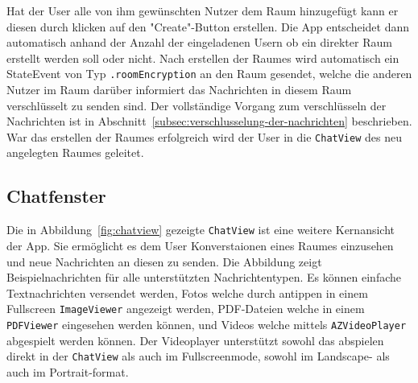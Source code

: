     Hat der User alle von ihm gewünschten Nutzer dem Raum hinzugefügt kann er diesen durch klicken auf den "Create"-Button erstellen.
    Die App entscheidet dann automatisch anhand der Anzahl der eingeladenen Usern ob ein direkter Raum erstellt werden soll oder nicht.
    Nach erstellen der Raumes wird automatisch ein StateEvent von Typ \texttt{.roomEncryption} an den Raum gesendet, welche die anderen Nutzer im Raum darüber informiert das Nachrichten in diesem Raum verschlüsselt zu senden sind.
    Der vollständige Vorgang zum verschlüsseln der Nachrichten ist in Abschnitt~\ref{subsec:verschlusselung-der-nachrichten} beschrieben.
    War das erstellen der Raumes erfolgreich wird der User in die \texttt{ChatView} des neu angelegten Raumes geleitet.

    \newpage
    \subsection{Chatfenster}
    Die in Abbildung~\ref{fig:chatview} gezeigte \texttt{ChatView} ist eine weitere Kernansicht der App.
    Sie ermöglicht es dem User Konverstaionen eines Raumes einzusehen und neue Nachrichten an diesen zu senden.
    Die Abbildung zeigt Beispielnachrichten für alle unterstützten Nachrichtentypen.
    Es können einfache Textnachrichten versendet werden, Fotos welche durch antippen in einem Fullscreen \texttt{ImageViewer} angezeigt werden,
    PDF-Dateien welche in einem \texttt{PDFViewer} eingesehen werden können, und Videos welche mittels \texttt{AZVideoPlayer} abgespielt werden können.
    Der Videoplayer unterstützt sowohl das abspielen direkt in der \texttt{ChatView} als auch im Fullscreenmode, sowohl im Landscape- als auch im Portrait-format.


